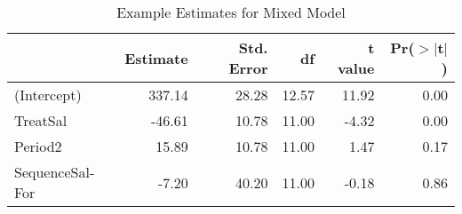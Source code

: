 \begin{table}[ht]
\centering
\begin{tabular}{l|rrrrr}
  \hline
 & Estimate & Std. Error & df & t value & Pr($>$$|$t$|$) \\ 
  \hline
(Intercept) & 337.14 & 28.28 & 12.57 & 11.92 & 0.00 \\ 
  TreatSal & -46.61 & 10.78 & 11.00 & -4.32 & 0.00 \\ 
  Period2 & 15.89 & 10.78 & 11.00 & 1.47 & 0.17 \\ 
  SequenceSal-For & -7.20 & 40.20 & 11.00 & -0.18 & 0.86 \\ 
   \hline
\end{tabular}
\caption{Example Estimates for Mixed Model} 
\label{modelTable}
\end{table}